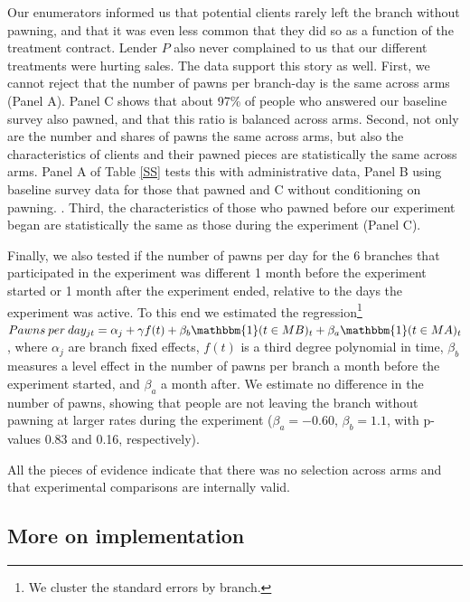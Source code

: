 \documentclass[oneside,11pt]{article}
\begin{document}
Our enumerators informed us that potential clients rarely left the branch without pawning, and that it was even less common that they did so as a function of the treatment contract. Lender $P$ also never complained to us that our different treatments were hurting sales. The data support this story as well. First, we cannot reject that the number of pawns per branch-day is the same across arms (Panel A). Panel C shows that about 97\% of people who answered our baseline survey also pawned, and that this ratio is balanced across arms.  Second, not only are the number and shares of pawns the same across arms, but also the characteristics of clients and their pawned pieces are statistically the same across arms. Panel A of Table \ref{SS} tests this with administrative data, Panel B using baseline survey data for those that pawned and C without conditioning on pawning. . %
Third, the characteristics of those who pawned before our experiment began are statistically the same as those during the experiment (Panel C).

Finally, we also tested if the number of pawns per day for the 6 branches that participated in the experiment was different 1 month before the experiment started or 1 month after the experiment ended, relative to the days the experiment was active. To this end we estimated the regression\footnote{We cluster the standard errors by branch.} $Pawns \: per \: day_{jt} = \alpha_j + \gamma f(t) + \beta_b \mathbbm{1}(t \in MB)_{t} +\beta_a \mathbbm{1}(t \in MA)_{t}$, where $\alpha_j$ are branch fixed effects, $f(t)$ is a third degree polynomial in time, $\beta_b$ measures a level effect in the number of pawns per branch a month before the experiment started, and $\beta_a$ a month after. We estimate no difference in the number of pawns, showing that people are not leaving the branch without pawning at larger rates during the experiment ($\beta_a=-0.60$, $\beta_b=1.1$, with p-values 0.83 and 0.16, respectively). 

All the pieces of evidence indicate that there was no selection across arms and that experimental comparisons are internally valid.

    
\subsection{More on implementation} \label{implementation}
\end{document}
